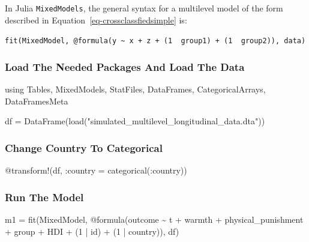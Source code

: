 \documentclass[
  letterpaper,
  DIV=11,
  numbers=noendperiod]{scrreprt}
\newenvironment{Shaded}{\begin{snugshade}}{\end{snugshade}}
\newcommand{\BuiltInTok}[1]{\textcolor[rgb]{0.00,0.23,0.31}{#1}}
\newcommand{\FloatTok}[1]{\textcolor[rgb]{0.68,0.00,0.00}{#1}}
\newcommand{\FunctionTok}[1]{\textcolor[rgb]{0.28,0.35,0.67}{#1}}
\newcommand{\ImportTok}[1]{\textcolor[rgb]{0.00,0.46,0.62}{#1}}
\newcommand{\NormalTok}[1]{\textcolor[rgb]{0.00,0.23,0.31}{#1}}
\newcommand{\OperatorTok}[1]{\textcolor[rgb]{0.37,0.37,0.37}{#1}}
\newcommand{\PreprocessorTok}[1]{\textcolor[rgb]{0.68,0.00,0.00}{#1}}
\newcommand{\StringTok}[1]{\textcolor[rgb]{0.13,0.47,0.30}{#1}}
\begin{document}
In Julia \texttt{MixedModels}, the general syntax for a multilevel model
of the form described in Equation~\ref{eq-crossclassfiedsimple} is:

\texttt{fit(MixedModel,\ @formula(y\ \textasciitilde{}\ x\ +\ z\ +\ (1\ \textbar{}\ group1)\ +\ (1\ \textbar{}\ group2)),\ data)}

\hypertarget{load-the-needed-packages-and-load-the-data-1}{%
\subsubsection{Load The Needed Packages And Load The
Data}\label{load-the-needed-packages-and-load-the-data-1}}

\begin{Shaded}
\begin{Highlighting}[]
\ImportTok{using} \BuiltInTok{Tables}\NormalTok{, }\BuiltInTok{MixedModels}\NormalTok{, }\BuiltInTok{StatFiles}\NormalTok{, }\BuiltInTok{DataFrames}\NormalTok{, }\BuiltInTok{CategoricalArrays}\NormalTok{, }\BuiltInTok{DataFramesMeta}

\NormalTok{df }\OperatorTok{=} \FunctionTok{DataFrame}\NormalTok{(}\FunctionTok{load}\NormalTok{(}\StringTok{"simulated\_multilevel\_longitudinal\_data.dta"}\NormalTok{))}
\end{Highlighting}
\end{Shaded}

\hypertarget{change-country-to-categorical-1}{%
\subsubsection{Change Country To
Categorical}\label{change-country-to-categorical-1}}

\begin{Shaded}
\begin{Highlighting}[]
\PreprocessorTok{@transform}\NormalTok{!(df, }\OperatorTok{:}\NormalTok{country }\OperatorTok{=} \FunctionTok{categorical}\NormalTok{(}\OperatorTok{:}\NormalTok{country))}
\end{Highlighting}
\end{Shaded}

\hypertarget{run-the-model-5}{%
\subsubsection{Run The Model}\label{run-the-model-5}}

\begin{Shaded}
\begin{Highlighting}[]

\NormalTok{m1 }\OperatorTok{=} \FunctionTok{fit}\NormalTok{(MixedModel, }\PreprocessorTok{@formula}\NormalTok{(outcome }\OperatorTok{\textasciitilde{}}\NormalTok{ t }\OperatorTok{+}\NormalTok{ warmth }\OperatorTok{+}\NormalTok{ physical\_punishment }\OperatorTok{+} 
\NormalTok{                                group }\OperatorTok{+}\NormalTok{ HDI }\OperatorTok{+}
\NormalTok{                                (}\FloatTok{1} \OperatorTok{|}\NormalTok{ id) }\OperatorTok{+}
\NormalTok{                                (}\FloatTok{1} \OperatorTok{|}\NormalTok{ country)), df)}
\end{Highlighting}
\end{Shaded}
\end{document}
